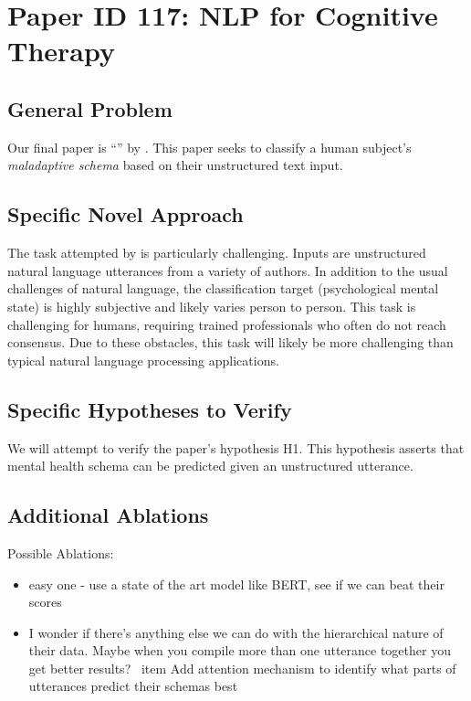 \documentclass[11pt,a4paper]{article}
\begin{document}
{\section{Paper ID 117: NLP for Cognitive Therapy}
\subsection{General Problem}
Our final paper is ``'' by \citeauthor*{burger_2021}. This paper seeks to classify a human subject's \emph{maladaptive schema} based on their unstructured text input. 

\subsection{Specific Novel Approach}
The task attempted by \citet{burger_2021} is particularly challenging. Inputs are unstructured natural language utterances from a variety of authors. In addition to the usual challenges of natural language, the classification target (psychological mental state) is highly subjective and likely varies person to person. This task is challenging for humans, requiring trained professionals who often do not reach consensus. Due to these obstacles, this task will likely be more challenging than typical natural language processing applications. 

\subsection{Specific Hypotheses to Verify}
We will attempt to verify the paper's hypothesis H1. This hypothesis asserts that mental health schema can be predicted given an unstructured utterance. 

\subsection{Additional Ablations}
Possible Ablations:
\begin{itemize}
  \item easy one - use a state of the art model like BERT, see if we can beat their scores 
  \item I wonder if there's anything else we can do with the hierarchical nature of their data. Maybe when you compile more than one utterance together you get better results?
  \ item Add attention mechanism to identify what parts of utterances predict their schemas best
\end{itemize}

}
\end{document}
